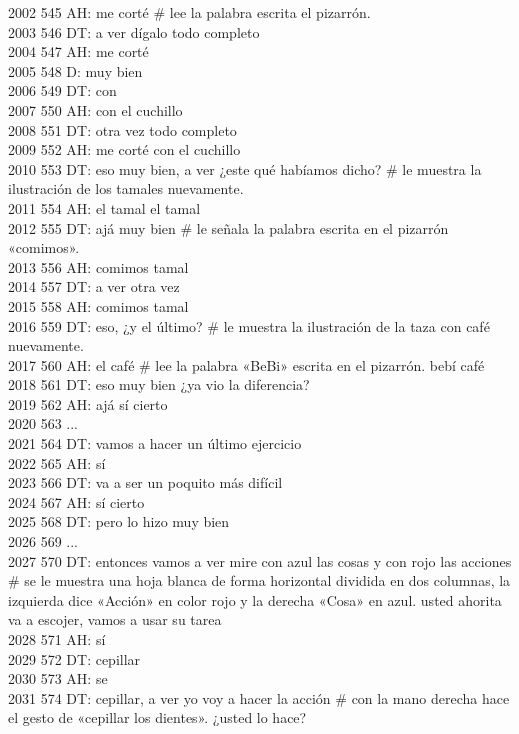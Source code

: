 2002 545 AH: me corté # lee la palabra escrita el pizarrón.\\
2003 546 DT: a ver dígalo todo completo\\
2004 547 AH: me corté\\
2005 548 D: muy bien\\
2006 549 DT: con\\
2007 550 AH: con el cuchillo\\
2008 551 DT: otra vez todo completo\\
2009 552 AH: me corté con el cuchillo\\
2010 553 DT: eso muy bien, a ver ¿este qué habíamos dicho? # le muestra la ilustración  de los tamales nuevamente.\\
2011 554 AH: el tamal el tamal\\
2012 555 DT: ajá muy bien # le señala la palabra escrita en el pizarrón «comimos».\\
2013 556 AH: comimos tamal\\
2014 557 DT: a ver otra vez\\
2015 558 AH: comimos tamal\\
2016 559 DT: eso, ¿y el último? # le muestra la ilustración de la taza con café nuevamente.\\
2017 560 AH: el café # lee la palabra «BeBi» escrita en el pizarrón. bebí café\\
2018 561 DT: eso muy bien ¿ya vio la diferencia?\\
2019 562 AH: ajá sí cierto\\
2020 563 ...\\
2021 564 DT: vamos a hacer un último ejercicio\\
2022 565 AH: sí\\
2023 566 DT: va a ser un poquito más difícil\\
2024 567 AH: sí cierto\\
2025 568 DT: pero lo hizo muy bien\\
2026 569 ...\\
2027 570 DT: entonces vamos a ver mire con azul las cosas y con rojo las acciones # se le muestra una hoja blanca de forma horizontal dividida en dos columnas, la izquierda dice «Acción» en color rojo y la derecha «Cosa» en azul. usted ahorita va a escojer, vamos a usar su tarea\\
2028 571 AH: sí\\
2029 572 DT: cepillar\\
2030 573 AH: se\\
2031 574 DT: cepillar, a ver yo voy a hacer la acción # con la mano derecha hace el gesto de «cepillar los dientes». ¿usted lo hace?\\
